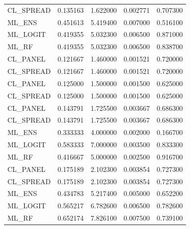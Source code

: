 \begin{table}
\begin{tabular}{lrrrr}
CL_SPREAD & 0.135163 & 1.622000 & 0.002771 & 0.707300 \\
ML_ENS & 0.451613 & 5.419400 & 0.007000 & 0.516100 \\
ML_LOGIT & 0.419355 & 5.032300 & 0.006500 & 0.871000 \\
ML_RF & 0.419355 & 5.032300 & 0.006500 & 0.838700 \\
CL_PANEL & 0.121667 & 1.460000 & 0.001521 & 0.720000 \\
CL_SPREAD & 0.121667 & 1.460000 & 0.001521 & 0.720000 \\
CL_PANEL & 0.125000 & 1.500000 & 0.001500 & 0.625000 \\
CL_SPREAD & 0.125000 & 1.500000 & 0.001500 & 0.625000 \\
CL_PANEL & 0.143791 & 1.725500 & 0.003667 & 0.686300 \\
CL_SPREAD & 0.143791 & 1.725500 & 0.003667 & 0.686300 \\
ML_ENS & 0.333333 & 4.000000 & 0.002000 & 0.166700 \\
ML_LOGIT & 0.583333 & 7.000000 & 0.003500 & 0.833300 \\
ML_RF & 0.416667 & 5.000000 & 0.002500 & 0.916700 \\
CL_PANEL & 0.175189 & 2.102300 & 0.003854 & 0.727300 \\
CL_SPREAD & 0.175189 & 2.102300 & 0.003854 & 0.727300 \\
ML_ENS & 0.434783 & 5.217400 & 0.005000 & 0.652200 \\
ML_LOGIT & 0.565217 & 6.782600 & 0.006500 & 0.782600 \\
ML_RF & 0.652174 & 7.826100 & 0.007500 & 0.739100 \\
\bottomrule
\end{tabular}
\end{table}
